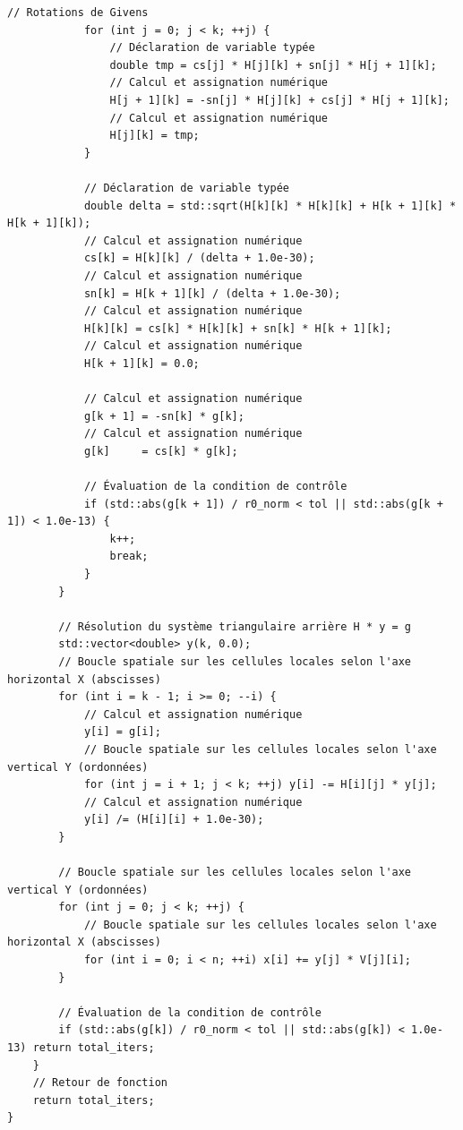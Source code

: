 \documentclass[10pt,a4paper,oneside]{book}
\begin{document}
\begin{lstlisting}[language={[11]C++}]
            // Rotations de Givens
            for (int j = 0; j < k; ++j) {
                // Déclaration de variable typée
                double tmp = cs[j] * H[j][k] + sn[j] * H[j + 1][k];
                // Calcul et assignation numérique
                H[j + 1][k] = -sn[j] * H[j][k] + cs[j] * H[j + 1][k];
                // Calcul et assignation numérique
                H[j][k] = tmp;
            }

            // Déclaration de variable typée
            double delta = std::sqrt(H[k][k] * H[k][k] + H[k + 1][k] * H[k + 1][k]);
            // Calcul et assignation numérique
            cs[k] = H[k][k] / (delta + 1.0e-30);
            // Calcul et assignation numérique
            sn[k] = H[k + 1][k] / (delta + 1.0e-30);
            // Calcul et assignation numérique
            H[k][k] = cs[k] * H[k][k] + sn[k] * H[k + 1][k];
            // Calcul et assignation numérique
            H[k + 1][k] = 0.0;

            // Calcul et assignation numérique
            g[k + 1] = -sn[k] * g[k];
            // Calcul et assignation numérique
            g[k]     = cs[k] * g[k];

            // Évaluation de la condition de contrôle
            if (std::abs(g[k + 1]) / r0_norm < tol || std::abs(g[k + 1]) < 1.0e-13) {
                k++;
                break;
            }
        }

        // Résolution du système triangulaire arrière H * y = g
        std::vector<double> y(k, 0.0);
        // Boucle spatiale sur les cellules locales selon l'axe horizontal X (abscisses)
        for (int i = k - 1; i >= 0; --i) {
            // Calcul et assignation numérique
            y[i] = g[i];
            // Boucle spatiale sur les cellules locales selon l'axe vertical Y (ordonnées)
            for (int j = i + 1; j < k; ++j) y[i] -= H[i][j] * y[j];
            // Calcul et assignation numérique
            y[i] /= (H[i][i] + 1.0e-30);
        }

        // Boucle spatiale sur les cellules locales selon l'axe vertical Y (ordonnées)
        for (int j = 0; j < k; ++j) {
            // Boucle spatiale sur les cellules locales selon l'axe horizontal X (abscisses)
            for (int i = 0; i < n; ++i) x[i] += y[j] * V[j][i];
        }

        // Évaluation de la condition de contrôle
        if (std::abs(g[k]) / r0_norm < tol || std::abs(g[k]) < 1.0e-13) return total_iters;
    }
    // Retour de fonction
    return total_iters;
}


\end{lstlisting}
\end{document}
